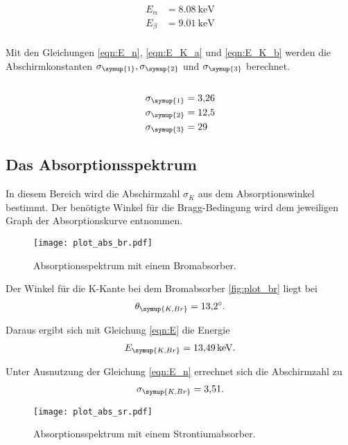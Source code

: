 \begin{align*}
  E_\alpha &= \SI{8.08}{\kilo\eV}\\
  E_\beta &= \SI{9.01}{\kilo\eV}\\
\end{align*}

Mit den Gleichungen \eqref{eqn:E_n}, \eqref{eqn:E_K_a} und
\eqref{eqn:E_K_b} werden die Abschirmkonstanten $\sigma_\symup{1}, \sigma_\symup{2}$ und
$\sigma_\symup{3}$ berechnet. \\\\

\begin{align*}
  \sigma_\symup{1} &= \num{3.26} \\
  \sigma_\symup{2} &= \num{12.5} \\
  \sigma_\symup{3} &= \num{29}
\end{align*}

\subsection{Das Absorptionsspektrum}

In diesem Bereich wird die Abschirmzahl $\sigma_K$ aus dem Absorptionswinkel bestimmt.
Der benötigte Winkel für die Bragg-Bedingung wird dem jeweiligen Graph der Absorptionskurve
entnommen. \\

\begin{figure}[H]
  \centering
  \texttt{[image: plot\_abs\_br.pdf]}
  \caption{Absorptionsspektrum mit einem Bromabsorber.}
  \label{fig:plot_br}
\end{figure}

Der Winkel für die K-Kante bei dem Bromabsorber \eqref{fig:plot_br} liegt bei
\begin{align*}
  \theta_\symup{K,Br} = \SI{13.2}{\degree}.
\end{align*}

Daraus ergibt sich mit Gleichung \eqref{eqn:E} die Energie
\begin{align*}
  E_\symup{K,Br} = \SI{13.49}{\kilo\eV}.
\end{align*}

Unter Ausnutzung der Gleichung \eqref{eqn:E_n} errechnet sich die Abschirmzahl zu
\begin{align*}
  \sigma_\symup{K,Br} = \num{3.51} .
\end{align*}

\begin{figure}[H]
  \centering
  \texttt{[image: plot\_abs\_sr.pdf]}
  \caption{Absorptionsspektrum mit einem Strontiumabsorber.}
  \label{fig:plot_sr}
\end{figure}


